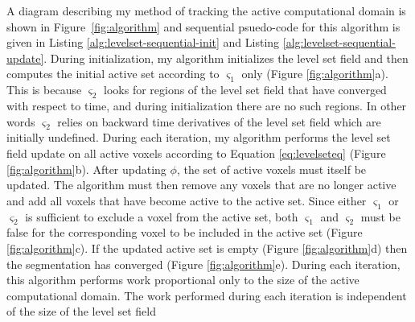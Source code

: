 A diagram describing my method of tracking the active computational domain is shown in Figure~\ref{fig:algorithm} and sequential psuedo-code for this algorithm is given in Listing \ref{alg:levelset-sequential-init} and Listing \ref{alg:levelset-sequential-update}. During initialization, my algorithm initializes the level set field and then computes the initial active set according to ${\varsigma}_{1}$ only (Figure \ref{fig:algorithm}a). This is because  ${ \varsigma }_{2}$ looks for regions of the level set field that have converged with respect to time, and during initialization there are no such regions. In other words ${\varsigma}_{2}$ relies on backward time derivatives of the level set field which are initially undefined. During each iteration, my algorithm performs the level set field update on all active voxels according to Equation \ref{eq:levelseteq} (Figure \ref{fig:algorithm}b). After updating $ \phi$, the set of active voxels must itself be updated. The algorithm must then remove any voxels that are no longer active and add all voxels that have become active to the active set. Since either ${\varsigma}_1 $ or ${\varsigma}_2 $ is sufficient to exclude a voxel from the active set, both ${\varsigma}_1 $ and ${\varsigma}_2 $ must be false for the corresponding voxel to be included in the active set (Figure \ref{fig:algorithm}c). If the updated active set is empty (Figure \ref{fig:algorithm}d) then the segmentation has converged (Figure \ref{fig:algorithm}e).
During each iteration, this algorithm performs work proportional only to the size of the active computational domain. The work performed during each iteration is independent of the size of the level set field


